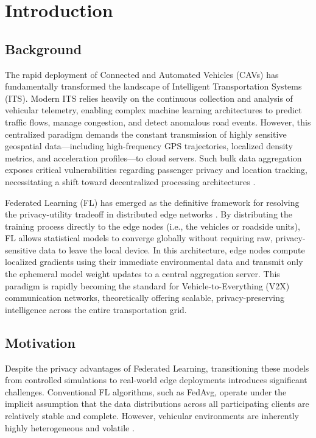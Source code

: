 \section{Introduction}

\subsection{Background}

The rapid deployment of Connected and Automated Vehicles (CAVs) has fundamentally transformed the landscape of Intelligent Transportation Systems (ITS). Modern ITS relies heavily on the continuous collection and analysis of vehicular telemetry, enabling complex machine learning architectures to predict traffic flows, manage congestion, and detect anomalous road events. However, this centralized paradigm demands the constant transmission of highly sensitive geospatial data---including high-frequency GPS trajectories, localized density metrics, and acceleration profiles---to cloud servers. Such bulk data aggregation exposes critical vulnerabilities regarding passenger privacy and location tracking, necessitating a shift toward decentralized processing architectures \cite{Zhang_2025}.

Federated Learning (FL) has emerged as the definitive framework for resolving the privacy-utility tradeoff in distributed edge networks \cite{Kairouz_2021}. By distributing the training process directly to the edge nodes (i.e., the vehicles or roadside units), FL allows statistical models to converge globally without requiring raw, privacy-sensitive data to leave the local device. In this architecture, edge nodes compute localized gradients using their immediate environmental data and transmit only the ephemeral model weight updates to a central aggregation server. This paradigm is rapidly becoming the standard for Vehicle-to-Everything (V2X) communication networks, theoretically offering scalable, privacy-preserving intelligence across the entire transportation grid.

\subsection{Motivation}

Despite the privacy advantages of Federated Learning, transitioning these models from controlled simulations to real-world edge deployments introduces significant challenges. Conventional FL algorithms, such as FedAvg, operate under the implicit assumption that the data distributions across all participating clients are relatively stable and complete. However, vehicular environments are inherently highly heterogeneous and volatile \cite{Lu_2024}.

